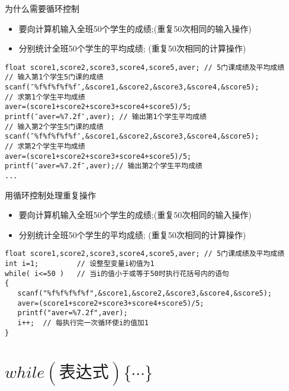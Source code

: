 
\begin{frame}{为什么需要循环控制}
\begin{itemize}
	\item 要向计算机输入全班50个学生的成绩;(重复50次相同的输入操作)
	\item 分别统计全班50个学生的平均成绩;	(重复50次相同的计算操作)
\end{itemize}
\begin{lstlisting}[frame=lines]
float score1,score2,score3,score4,score5,aver; // 5门课成绩及平均成绩
// 输入第1个学生5门课的成绩
scanf(″%f%f%f%f%f″,&score1,&score2,&score3,&score4,&score5);
// 求第1个学生平均成绩
aver=(score1+score2+score3+score4+score5)/5;
printf(″aver=%7.2f″,aver); // 输出第1个学生平均成绩
// 输入第2个学生5门课的成绩
scanf(″%f%f%f%f%f″,&score1,&score2,&score3,&score4,&score5);
// 求第2个学生平均成绩
aver=(score1+score2+score3+score4+score5)/5;
printf(″aver=%7.2f″,aver);// 输出第2个学生平均成绩
...
\end{lstlisting}
\end{frame}

\begin{frame}{用循环控制处理重复操作}
\begin{itemize}
	\item 要向计算机输入全班50个学生的成绩;(重复50次相同的输入操作)
	\item 分别统计全班50个学生的平均成绩;	(重复50次相同的计算操作)
\end{itemize}
\begin{lstlisting}[frame=lines]
float score1,score2,score3,score4,score5,aver; // 5门课成绩及平均成绩
int i=1;         // 设整型变量i初值为1   
while( i<=50 )   // 当i的值小于或等于50时执行花括号内的语句
{
   scanf("%f%f%f%f%f",&score1,&score2,&score3,&score4,&score5);
   aver=(score1+score2+score3+score4+score5)/5; 
   printf("aver=%7.2f",aver);
   i++;  // 每执行完一次循环使i的值加1 
}   
\end{lstlisting}
\end{frame}

\section{$while(\text{表达式})\{ \cdots\}$}

